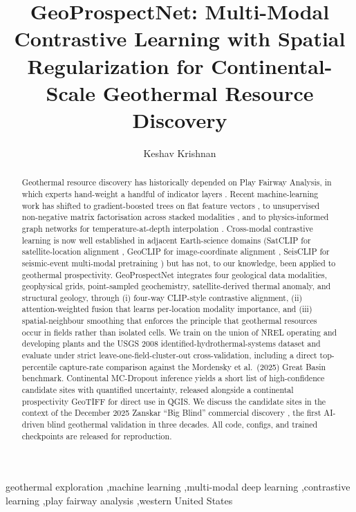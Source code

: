 \documentclass[review,12pt]{elsarticle}
\begin{document}
\begin{frontmatter}

\title{GeoProspectNet: Multi-Modal Contrastive Learning with Spatial Regularization for Continental-Scale Geothermal Resource Discovery}

\author{Keshav Krishnan}
\address{Independent Researcher, USA}

\begin{abstract}
Geothermal resource discovery has historically depended on Play Fairway Analysis, in which experts hand-weight a handful of indicator layers \citep{Faulds2020,Coolbaugh2005}. Recent machine-learning work has shifted to gradient-boosted trees on flat feature vectors \citep{Mordensky2025,Brown2023}, to unsupervised non-negative matrix factorisation across stacked modalities \citep{Vesselinov2022,Ahmmed2022}, and to physics-informed graph networks for temperature-at-depth interpolation \citep{Smith2024}. Cross-modal contrastive learning is now well established in adjacent Earth-science domains (SatCLIP for satellite-location alignment \citep{Klemmer2025}, GeoCLIP for image-coordinate alignment \citep{Vivanco2023}, SeisCLIP for seismic-event multi-modal pretraining \citep{Si2024}) but has not, to our knowledge, been applied to geothermal prospectivity. GeoProspectNet integrates four geological data modalities, geophysical grids, point-sampled geochemistry, satellite-derived thermal anomaly, and structural geology, through (i) four-way CLIP-style contrastive alignment, (ii) attention-weighted fusion that learns per-location modality importance, and (iii) spatial-neighbour smoothing that enforces the principle that geothermal resources occur in fields rather than isolated cells. We train on the union of NREL operating and developing plants and the USGS 2008 identified-hydrothermal-systems dataset and evaluate under strict leave-one-field-cluster-out cross-validation, including a direct top-percentile capture-rate comparison against the Mordensky et al.\ (2025) Great Basin benchmark. Continental MC-Dropout inference yields a short list of high-confidence candidate sites with quantified uncertainty, released alongside a continental prospectivity GeoTIFF for direct use in QGIS. We discuss the candidate sites in the context of the December 2025 Zanskar ``Big Blind'' commercial discovery \citep{ZanskarBigBlind2025}, the first AI-driven blind geothermal validation in three decades. All code, configs, and trained checkpoints are released for reproduction.
\end{abstract}

\begin{keyword}
geothermal exploration \sep machine learning \sep multi-modal deep learning \sep contrastive learning \sep play fairway analysis \sep western United States
\end{keyword}

\end{frontmatter}
\end{document}
